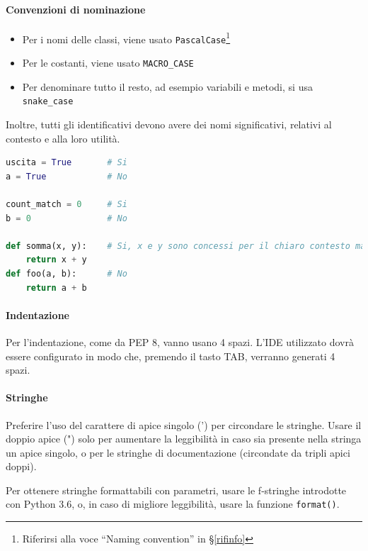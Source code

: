 		\paragraph{Convenzioni di nominazione}\label{PP:Sviluppo:Codifica:ConvenzioniDiNominazione}
		\begin{itemize}
			\item Per i nomi delle classi, viene usato \texttt{PascalCase}\footnote{Riferirsi alla voce ``Naming convention'' in \S\ref{rifinfo}}
			\item Per le costanti, viene usato \texttt{MACRO\_CASE}
			\item Per denominare tutto il resto, ad esempio variabili e metodi, si usa \texttt{snake\_case}
		\end{itemize}

		Inoltre, tutti gli identificativi devono avere dei nomi significativi, relativi al contesto e alla loro utilità.
\begin{lstlisting}[language=Python]
uscita = True		# Si
a = True			# No

count_match = 0		# Si
b = 0				# No

def somma(x, y):	# Si, x e y sono concessi per il chiaro contesto matematico
	return x + y
def foo(a, b):		# No
	return a + b
\end{lstlisting}


        \paragraph{Indentazione}\label{PP:Sviluppo:Codifica:Indentazione}
		Per l'indentazione, come da PEP 8, vanno usano 4 spazi. L'IDE utilizzato dovrà essere configurato in modo che, premendo il
		tasto TAB, verranno generati 4 spazi.

		\paragraph{Stringhe}\label{PP:Sviluppo:Codifica:Stringhe}
		Preferire l'uso del carattere di apice singolo (') per circondare le stringhe. Usare il doppio apice (") solo per aumentare la
		leggibilità in caso sia presente nella stringa un apice singolo, o per le stringhe di documentazione (circondate da tripli apici doppi).\par
		Per ottenere stringhe formattabili con parametri, usare le f-stringhe introdotte con Python 3.6, o, in caso di migliore leggibilità, usare la funzione \texttt{format()}.

